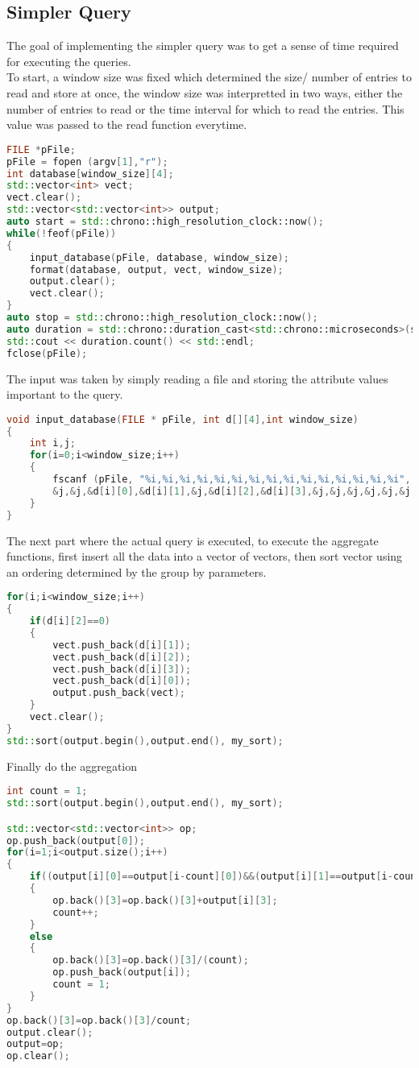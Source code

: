 \subsection{Simpler Query}
The goal of implementing the simpler query was to get a sense of time required for executing the queries.\\
To start, a window size was fixed which determined the size/ number of entries to read and store at once, the window size was interpretted in two ways, either the number of entries to read or the time interval for which to read the entries. This value was passed to the read function everytime.
\begin{lstlisting}[language=C++]
FILE *pFile;
pFile = fopen (argv[1],"r");
int database[window_size][4];
std::vector<int> vect;
vect.clear();
std::vector<std::vector<int>> output;
auto start = std::chrono::high_resolution_clock::now();
while(!feof(pFile))
{
    input_database(pFile, database, window_size);
    format(database, output, vect, window_size);
    output.clear();
    vect.clear();
}
auto stop = std::chrono::high_resolution_clock::now(); 
auto duration = std::chrono::duration_cast<std::chrono::microseconds>(stop - start);
std::cout << duration.count() << std::endl;
fclose(pFile);
\end{lstlisting}
The input was taken by simply reading a file and storing the attribute values important to the query. 
\begin{lstlisting}[language=C++]
void input_database(FILE * pFile, int d[][4],int window_size)
{
    int i,j;
    for(i=0;i<window_size;i++)
    {
        fscanf (pFile, "%i,%i,%i,%i,%i,%i,%i,%i,%i,%i,%i,%i,%i,%i,%i", &j,
        &j,&j,&d[i][0],&d[i][1],&j,&d[i][2],&d[i][3],&j,&j,&j,&j,&j,&j,&j);
    }
}
\end{lstlisting}
The next part where the actual query is executed, to execute the aggregate functions, first insert all the data into a vector of vectors, then sort vector using an ordering determined by the group by parameters. 
\begin{lstlisting}[language=C++]
for(i;i<window_size;i++)
{
    if(d[i][2]==0)
    {
        vect.push_back(d[i][1]);
        vect.push_back(d[i][2]);
        vect.push_back(d[i][3]);
        vect.push_back(d[i][0]);
        output.push_back(vect);
    }
    vect.clear();
}
std::sort(output.begin(),output.end(), my_sort);
\end{lstlisting}
Finally do the aggregation
\begin{lstlisting}[language=C++]
int count = 1;
std::sort(output.begin(),output.end(), my_sort);

std::vector<std::vector<int>> op;
op.push_back(output[0]);
for(i=1;i<output.size();i++)
{
    if((output[i][0]==output[i-count][0])&&(output[i][1]==output[i-count][1])&&(output[i][2]==output[i-count][2]))
    {
        op.back()[3]=op.back()[3]+output[i][3];
        count++;
    }
    else
    {
        op.back()[3]=op.back()[3]/(count);
        op.push_back(output[i]);
        count = 1;
    }
}
op.back()[3]=op.back()[3]/count;
output.clear();
output=op;
op.clear();
\end{lstlisting}

